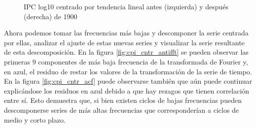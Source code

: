 \documentclass[a4paper]{article}
\begin{document}
\begin{figure}[H]
	\centering
	\caption{IPC log10 centrado por tendencia lineal antes (izquierda) y después (derecha) de 1900} 	
	\label{fig:cpi_log10_cntr_fft}
\end{figure}

Ahora podemos tomar las frecuencias más bajas y descomponer la serie centrada por ellas, analizar el ajuste de estas nuevas series y visualizar la serie resultante de esta descomposición. En la figura \ref{fig:cpi_cntr_antifft} se pueden observar las primeras 9 componentes de más baja frecuencia de la transformada de Fourier y, en azul, el residuo de restar los valores de la transformación de la serie de tiempo. En la figura \ref{fig:cpi_cntr_acf} puede observarse también que aún puede continuar explicándose los residuos en azul debido a que hay rezagos que tienen correlación entre sí. Esto demuestra que, si bien existen ciclos de bajas frecuencias pueden descomponerse series de más altas frecuencias que corresponderían a ciclos de medio y corto plazo.
\end{document}
